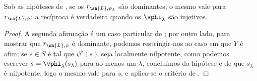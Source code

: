 \documentclass[oneside,10pt]{amsart}
\newcommand{\oldpage}[2][]{\marginnote{\normalfont\footnotesize\textbf{#1}~|~#2}\ignorespaces}
\let\EGAOriginalLabel\label
\renewcommand{\label}[1]{\phantomsection\EGAOriginalLabel{#1}}
\begin{document}
\begin{corollary}[3.7.8]
\label{II.3.7.8}
Sob as hipóteses de , se os $r_{\sh{L},\psi_\lambda}$ são dominantes, o mesmo vale para $r_{\sh{L},\psi}$;
a recíproca é verdadeira quando os $\vphi_\lambda$ são injetivos.
\end{corollary}
\oldpage[II]{68}

\begin{proof}
A segunda afirmação é um caso particular de ;
por outro lado, para mostrar que $r_{\sh{L},\psi}$ é dominante, podemos restringir-nos ao caso em que $Y$ é afim;
se $s\in S$ é tal que $\psi^\flat(s)$ seja localmente nilpotente, como podemos escrever $s=\vphi_\lambda(s_\lambda)$ para ao menos um $\lambda$, concluímos da hipótese e de  que $s_\lambda$ é nilpotente, logo o mesmo vale para $s$, e aplica-se o critério de .
\end{proof}
\end{document}
